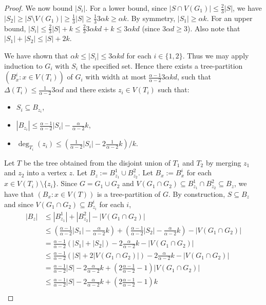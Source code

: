 \begin{proof}
We now bound $|S_i|$. For a lower bound, since $|S\cap V(G_1)|\leq \frac23 |S|$, we have $|S_2|\geq |S\setminus V(G_1)|\geq \frac13 |S| \geq \frac13 3 \alpha  k \geq \alpha k $. By symmetry, $|S_1|\geq  \alpha k $. For an upper bound, $|S_i|\leq\frac23 |S| + k \leq \frac23 3 \alpha  kd + k \leq 3 \alpha  kd$ (since $3 \alpha  d\geq 3$). Also note that $|S_1|+|S_2|\leq |S|+2k$.

We have shown that $\alpha k \leq |S_i|\leq 3 \alpha  kd$ for each $i\in\{1,2\}$. Thus we may apply induction to $G_i$ with $S_i$ the specified set. Hence there exists a tree-partition $(B^i_x:x\in V(T_i))$ of $G_i$ with width at most $\frac{\alpha-1}{\alpha-2}  3 \alpha    kd$, such that $\Delta(T_i)\leq \frac{1}{\alpha-2} 3 \alpha   d$ and there exists $z_i\in V(T_i)$ such that:
\begin{itemize}
    \item $S_i\subseteq B_{z_i}$, 
    \item $|B_{z_i}|\leq \frac{\alpha-1}{\alpha-2} |S_i|- \frac{\alpha}{\alpha-2} k$,
    \item $\deg_{T_i}(z_i)\leq ( \frac{1}{\alpha-2} |S_i| - 2 \frac{1}{\alpha-2}  k)/k$.
\end{itemize}
Let $T$ be the tree obtained from the disjoint union of $T_1$ and $T_2$ by merging $z_1$ and $z_2$ into a vertex $z$. Let $B_z:= B^1_{z_1}\cup B^2_{z_2}$. Let $B_x:= B^i_x$ for each $x\in V(T_i)\setminus\{z_i\}$. Since $G=G_1\cup G_2$ and $V(G_1\cap G_2)\subseteq B^1_{z_1}\cap B^2_{z_2} \subseteq B_z$, we have that $(B_x:x\in V(T))$ is a tree-partition of $G$. 
By construction, $S\subseteq B_z$ and since $V(G_1\cap G_2)\subseteq B^i_{z_i}$ for each $i$, 
\begin{align*}
    |B_z| 
    & \leq |B^1_{z_1}|+|B^2_{z_2}| - |V(G_1\cap G_2)|\\
    & \leq (\frac{\alpha-1}{\alpha-2} |S_1|- \frac{\alpha}{\alpha-2} k) +  (\frac{\alpha-1}{\alpha-2} |S_2|- \frac{\alpha}{\alpha-2} k) - |V(G_1\cap G_2)|\\
    & = \frac{\alpha-1}{\alpha-2} ( |S_1|+ |S_2|) -2 \frac{\alpha}{\alpha-2} k - |V(G_1\cap G_2)|\\
    & \leq \frac{\alpha-1}{\alpha-2} ( |S| + 2|V(G_1\cap G_2)| ) -2 \frac{\alpha}{\alpha-2} k - |V(G_1\cap G_2)|\\
    & = \frac{\alpha-1}{\alpha-2}  |S|  -2 \frac{\alpha}{\alpha-2} k + (2\frac{\alpha-1}{\alpha-2} -1) |V(G_1\cap G_2)|\\
    & \leq \frac{\alpha-1}{\alpha-2}  |S|  -2 \frac{\alpha}{\alpha-2} k + (2\frac{\alpha-1}{\alpha-2} -1) k\\

\end{align*}
\end{proof}
